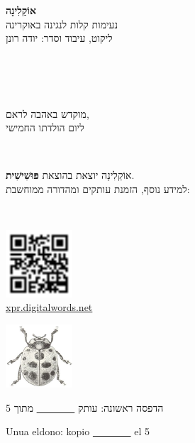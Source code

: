 \begin{titlepage}

\dulingvaujo
{
	\begin{center}
		\textbf{אוֹקַלִינָה}\\
		נעימות קלות לנגינה באוקרינה\\[1ex]
		ליקוט, עיבוד וסדר: יודה רונן
	\end{center}
}
{
	\begin{center}
		\\
		\\[1ex]
		\\
	\end{center}
}

\apartigilo

\dulingvaujo
{
	\begin{center}
		מוקדש באהבה לראם,\\
		ליום הולדתו החמישי
	\end{center}
}
{
	\begin{center}
		\\
	\end{center}
}

\apartigilo

\dulingvaujo
{
	\begin{center}
		אוֹקַלִינָה יוצאת בהוצאת \textbf{פּוּשִׁישִׁית}.\\
		למידע נוסף, הזמנת עותקים ומהדורה ממוחשבת:
	\end{center}
}
{
	\begin{center}
		\\
	\end{center}
}

\begin{center}
	\includegraphics[width=2.5cm]{"retejo.png"}\\
	\url{xpr.digitalwords.net}

	\includegraphics[width=2.5cm]{"puŝiŝit.png"}
\end{center}

\apartigilo

\vfill

\dulingvaujo
{
	\begin{center}
		הדפסה ראשונה: עותק \underline{~ ~ ~ ~ ~} מתוך 5
	\end{center}
}
{
	\begin{center}
		Unua eldono: kopio \underline{~ ~ ~ ~ ~} el 5
	\end{center}
}

\end{titlepage}
